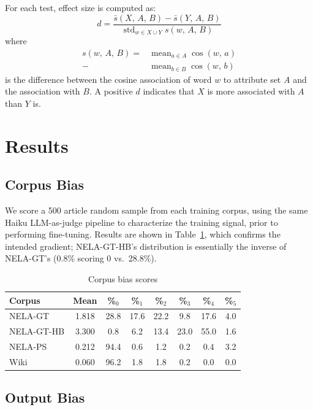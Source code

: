 \documentclass[11pt]{article}
\begin{document}
For each test, effect size is computed as:
\[
  d = \frac{\bar{s}(X,\,A,\,B) - \bar{s}(Y,\,A,\,B)}
  {\operatorname{std}_{w \in X \cup Y} s(w,\,A,\,B)}
\]
where
\[
\begin{split}
  s(w,\,A,\,B) =
  {}&\operatorname{mean}_{a \in A} \cos(w,\,a) \\
  {}-{} &\operatorname{mean}_{b \in B} \cos(w,\,b)
\end{split}
\]
is the difference between the cosine association of word $w$ to attribute set $A$ and the association with $B$.
A positive $d$ indicates that $X$ is more associated with $A$ than $Y$ is.

\section{Results}

\subsection{Corpus Bias}
\label{subsec:corpus_bias}

We score a 500 article random sample from each training corpus, using the same Haiku LLM-as-judge pipeline to characterize the training signal, prior to performing fine-tuning. 
Results are shown in Table~\ref{tab:corpus_bias}, which confirms the intended gradient; NELA-GT-HB's distribution is essentially the inverse of NELA-GT's (0.8\% scoring 0 vs.\ 28.8\%).

\begin{table}[htbp]
  \centering
  \footnotesize
  \setlength{\tabcolsep}{3pt}
  \begin{tabular}{lccccccc}
    \toprule
    Corpus & Mean & \%$_{0}$ & \%$_{1}$ & \%$_{2}$ & \%$_{3}$ & \%$_{4}$ & \%$_{5}$ \\
    \midrule
    NELA-GT     & 1.818 & 28.8 & 17.6 & 22.2 &  9.8 & 17.6 & 4.0 \\
    NELA-GT-HB  & 3.300 &  0.8 &  6.2 & 13.4 & 23.0 & 55.0 & 1.6 \\
    NELA-PS     & 0.212 & 94.4 &  0.6 &  1.2 &  0.2 &  0.4 & 3.2 \\
    Wiki        & 0.060 & 96.2 &  1.8 &  1.8 &  0.2 &  0.0 & 0.0 \\
    \bottomrule
  \end{tabular}
  \caption{Corpus bias scores}
  \label{tab:corpus_bias}
\end{table}


\subsection{Output Bias}
\end{document}
